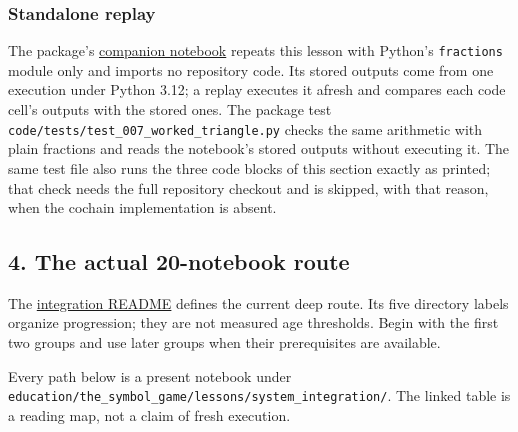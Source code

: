 \documentclass[
  11pt,
]{article}
\newcommand{\passthrough}[1]{#1}
\begin{document}
\subsubsection{Standalone replay}\label{standalone-replay}

The package's
\href{https://github.com/dbccpage/the_symbol_game/blob/52cb5457f6c485ba548cfd292f6012a941ed22cf/atlas/coda_atlas/symbol_game/007_pfp_executable_lessons_and_evidence_boundaries/jupyter_notebooks/007_moving_a_discrepancy.ipynb}{companion
notebook} repeats this lesson with Python's
\passthrough{\lstinline!fractions!} module only and imports no
repository code. Its stored outputs come from one execution under Python
3.12; a replay executes it afresh and compares each code cell's outputs
with the stored ones. The package test
\nolinkurl{code/tests/test_007_worked_triangle.py} checks the same
arithmetic with plain fractions and reads the notebook's stored outputs
without executing it. The same test file also runs the three code blocks
of this section exactly as printed; that check needs the full repository
checkout and is skipped, with that reason, when the cochain
implementation is absent.

\subsection{4. The actual 20-notebook
route}\label{the-actual-20-notebook-route}

The
\href{https://github.com/dbccpage/the_symbol_game/blob/52cb5457f6c485ba548cfd292f6012a941ed22cf/education/the_symbol_game/lessons/system_integration/README.md}{integration
README} defines the current deep route. Its five directory labels
organize progression; they are not measured age thresholds. Begin with
the first two groups and use later groups when their prerequisites are
available.

Every path below is a present notebook under
\nolinkurl{education/the_symbol_game/lessons/system_integration/}.
The linked table is a reading map, not a claim of fresh execution.
\end{document}
